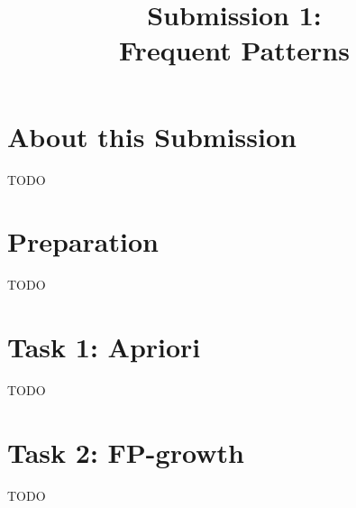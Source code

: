 \documentclass[
english,
smallborders
]{i6prcsht}
\begin{document}
\title{Submission 1: \\ Frequent Patterns}
\maketitle
\vspace*{-2cm}

\section*{About this Submission}

TODO

\section*{Preparation}

TODO

\section*{Task 1: Apriori}

TODO

\section*{Task 2: FP-growth}

TODO
\end{document}
